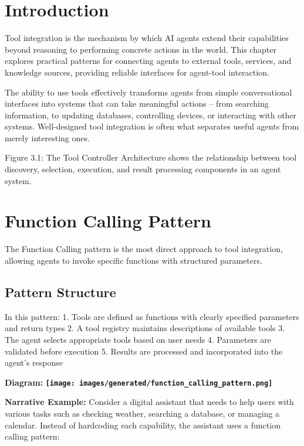 \documentclass[11pt,oneside]{book}
\providecommand{\pandocbounded}[1]{\textbf{#1}}
\begin{document}
\section{Introduction}\label{introduction-3}

Tool integration is the mechanism by which AI agents extend their
capabilities beyond reasoning to performing concrete actions in the
world. This chapter explores practical patterns for connecting agents to
external tools, services, and knowledge sources, providing reliable
interfaces for agent-tool interaction.

The ability to use tools effectively transforms agents from simple
conversational interfaces into systems that can take meaningful actions
-- from searching information, to updating databases, controlling
devices, or interacting with other systems. Well-designed tool
integration is often what separates useful agents from merely
interesting ones.

Figure 3.1: The Tool Controller Architecture shows the relationship
between tool discovery, selection, execution, and result processing
components in an agent system.

\section{Function Calling Pattern}\label{function-calling-pattern}

The Function Calling pattern is the most direct approach to tool
integration, allowing agents to invoke specific functions with
structured parameters.

\subsection{Pattern Structure}\label{pattern-structure-1}

In this pattern: 1. Tools are defined as functions with clearly
specified parameters and return types 2. A tool registry maintains
descriptions of available tools 3. The agent selects appropriate tools
based on user needs 4. Parameters are validated before execution 5.
Results are processed and incorporated into the agent's response

\textbf{Diagram:}
\pandocbounded{\texttt{[image: images/generated/function\_calling\_pattern.png]}}

\textbf{Narrative Example:} Consider a digital assistant that needs to
help users with various tasks such as checking weather, searching a
database, or managing a calendar. Instead of hardcoding each capability,
the assistant uses a function calling pattern:
\end{document}
